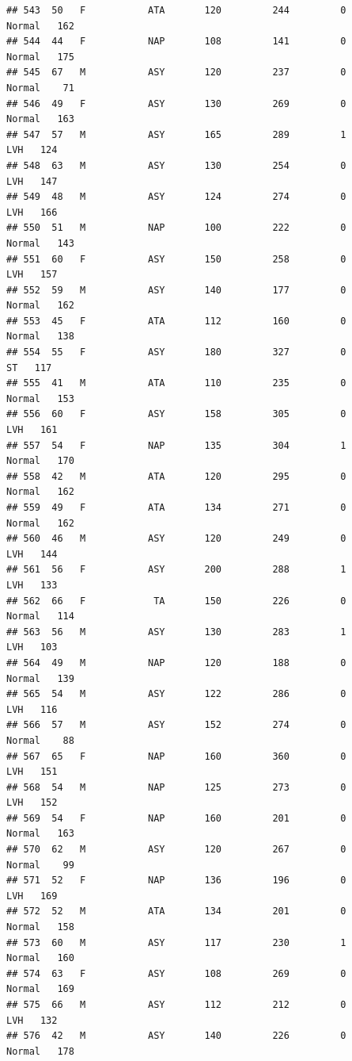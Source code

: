 \documentclass[
]{article}
\begin{document}
\begin{verbatim}
## 543  50   F           ATA       120         244         0     Normal   162
## 544  44   F           NAP       108         141         0     Normal   175
## 545  67   M           ASY       120         237         0     Normal    71
## 546  49   F           ASY       130         269         0     Normal   163
## 547  57   M           ASY       165         289         1        LVH   124
## 548  63   M           ASY       130         254         0        LVH   147
## 549  48   M           ASY       124         274         0        LVH   166
## 550  51   M           NAP       100         222         0     Normal   143
## 551  60   F           ASY       150         258         0        LVH   157
## 552  59   M           ASY       140         177         0     Normal   162
## 553  45   F           ATA       112         160         0     Normal   138
## 554  55   F           ASY       180         327         0         ST   117
## 555  41   M           ATA       110         235         0     Normal   153
## 556  60   F           ASY       158         305         0        LVH   161
## 557  54   F           NAP       135         304         1     Normal   170
## 558  42   M           ATA       120         295         0     Normal   162
## 559  49   F           ATA       134         271         0     Normal   162
## 560  46   M           ASY       120         249         0        LVH   144
## 561  56   F           ASY       200         288         1        LVH   133
## 562  66   F            TA       150         226         0     Normal   114
## 563  56   M           ASY       130         283         1        LVH   103
## 564  49   M           NAP       120         188         0     Normal   139
## 565  54   M           ASY       122         286         0        LVH   116
## 566  57   M           ASY       152         274         0     Normal    88
## 567  65   F           NAP       160         360         0        LVH   151
## 568  54   M           NAP       125         273         0        LVH   152
## 569  54   F           NAP       160         201         0     Normal   163
## 570  62   M           ASY       120         267         0     Normal    99
## 571  52   F           NAP       136         196         0        LVH   169
## 572  52   M           ATA       134         201         0     Normal   158
## 573  60   M           ASY       117         230         1     Normal   160
## 574  63   F           ASY       108         269         0     Normal   169
## 575  66   M           ASY       112         212         0        LVH   132
## 576  42   M           ASY       140         226         0     Normal   178

\end{verbatim}
\end{document}
